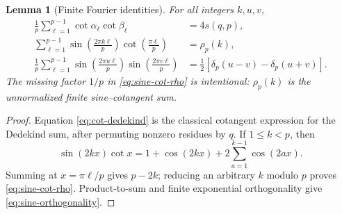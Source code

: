 \documentclass[11pt]{article}
\newtheorem{lemma}[theorem]{Lemma}
\theoremstyle{definition}
\begin{document}
\begin{lemma}[Finite Fourier identities]
\label{lem:finite-fourier}
For all integers $k,u,v$,
\begin{align}
 \frac1p\sum_{\ell=1}^{p-1}
 \cot\alpha_\ell\cot\beta_\ell&=4s(q,p),
 \label{eq:cot-dedekind}\\
 \sum_{\ell=1}^{p-1}
 \sin\left(\frac{2\pi k\ell}{p}\right)
 \cot\left(\frac{\pi\ell}{p}\right)&=\rho_p(k),
 \label{eq:sine-cot-rho}\\
 \frac1p\sum_{\ell=1}^{p-1}
 \sin\left(\frac{2\pi u\ell}{p}\right)
 \sin\left(\frac{2\pi v\ell}{p}\right)
 &=\frac12\left[\delta_p(u-v)-\delta_p(u+v)\right].
 \label{eq:sine-orthogonality}
\end{align}
The missing factor $1/p$ in \eqref{eq:sine-cot-rho} is intentional:
$\rho_p(k)$ is the unnormalized finite sine--cotangent sum.
\end{lemma}

\begin{proof}
Equation \eqref{eq:cot-dedekind} is the classical cotangent expression for
the Dedekind sum, after permuting nonzero residues by $q$.  If
$1\leq k<p$, then
\[
 \sin(2kx)\cot x
 =1+\cos(2kx)+2\sum_{a=1}^{k-1}\cos(2ax).
\]
Summing at $x=\pi\ell/p$ gives $p-2k$; reducing an arbitrary $k$ modulo
$p$ proves \eqref{eq:sine-cot-rho}.  Product-to-sum and finite exponential
orthogonality give \eqref{eq:sine-orthogonality}.
\end{proof}
\end{document}
